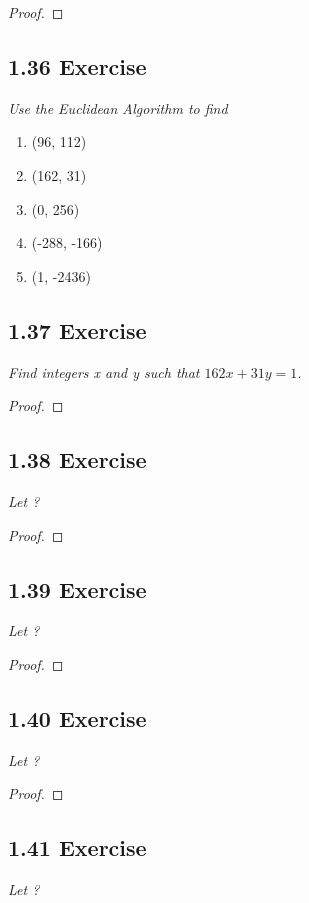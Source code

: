 \documentclass{article}
\begin{document}
\begin{proof}
\end{proof}

\subsection*{1.36 Exercise} 
\quad \textit{Use the Euclidean Algorithm to find}

\begin{enumerate}
    \item (96, 112)
    \item (162, 31)
    \item (0, 256)
    \item (-288, -166)
    \item (1, -2436)
\end{enumerate}

\subsection*{1.37 Exercise} 
\quad \textit{Find integers x and y such that $162x+31y=1$.}

\begin{proof}
\end{proof}

\subsection*{1.38 Exercise} 
\quad \textit{Let ?}

\begin{proof}
\end{proof}

\subsection*{1.39 Exercise} 
\quad \textit{Let ?}

\begin{proof}
\end{proof}

\subsection*{1.40 Exercise} 
\quad \textit{Let ?}

\begin{proof}
\end{proof}

\subsection*{1.41 Exercise} 
\quad \textit{Let ?}
\end{document}
